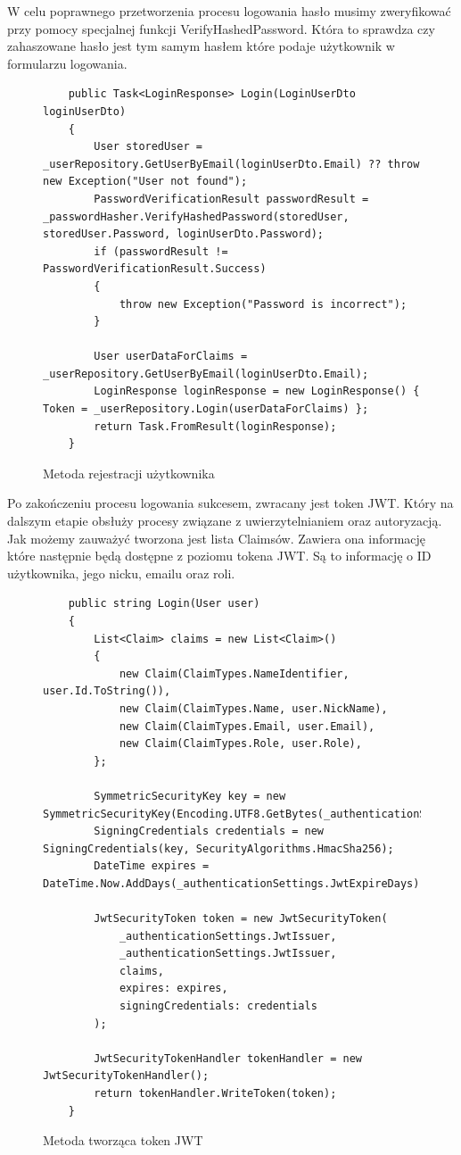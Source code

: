 \documentclass[a4paper,twoside,12pt]{book}
\begin{document}
W celu poprawnego przetworzenia procesu logowania hasło musimy zweryfikować przy pomocy specjalnej funkcji VerifyHashedPassword. Która to sprawdza czy zahaszowane hasło jest tym samym hasłem które podaje użytkownik w formularzu logowania. 

    \begin{figure}[H]
        \begin{lstlisting}
    public Task<LoginResponse> Login(LoginUserDto loginUserDto)
    {
        User storedUser = _userRepository.GetUserByEmail(loginUserDto.Email) ?? throw new Exception("User not found");
        PasswordVerificationResult passwordResult = _passwordHasher.VerifyHashedPassword(storedUser, storedUser.Password, loginUserDto.Password);
        if (passwordResult != PasswordVerificationResult.Success)
        {
            throw new Exception("Password is incorrect");
        }

        User userDataForClaims = _userRepository.GetUserByEmail(loginUserDto.Email);
        LoginResponse loginResponse = new LoginResponse() { Token = _userRepository.Login(userDataForClaims) };
        return Task.FromResult(loginResponse);
    }
        \end{lstlisting}
    \caption{Metoda rejestracji użytkownika}
    \label{fig:pseudokod:listings}
    \end{figure}

Po zakończeniu procesu logowania sukcesem, zwracany jest token JWT. Który na dalszym etapie obsłuży procesy związane z uwierzytelnianiem oraz autoryzacją. Jak możemy zauważyć tworzona jest lista Claimsów. Zawiera ona informację które następnie będą dostępne z poziomu tokena JWT. Są to informację o ID użytkownika, jego nicku, emailu oraz roli.

        \begin{figure}[H]
        \begin{lstlisting}
    public string Login(User user)
    {
        List<Claim> claims = new List<Claim>()
        {
            new Claim(ClaimTypes.NameIdentifier, user.Id.ToString()),
            new Claim(ClaimTypes.Name, user.NickName),
            new Claim(ClaimTypes.Email, user.Email),
            new Claim(ClaimTypes.Role, user.Role),
        };

        SymmetricSecurityKey key = new SymmetricSecurityKey(Encoding.UTF8.GetBytes(_authenticationSettings.JwtKey));
        SigningCredentials credentials = new SigningCredentials(key, SecurityAlgorithms.HmacSha256);
        DateTime expires = DateTime.Now.AddDays(_authenticationSettings.JwtExpireDays);

        JwtSecurityToken token = new JwtSecurityToken(
            _authenticationSettings.JwtIssuer,
            _authenticationSettings.JwtIssuer,
            claims,
            expires: expires,
            signingCredentials: credentials
        );

        JwtSecurityTokenHandler tokenHandler = new JwtSecurityTokenHandler();
        return tokenHandler.WriteToken(token);
    }
        \end{lstlisting}
    \caption{Metoda tworząca token JWT}
    \label{fig:pseudokod:listings}
    \end{figure}
\end{document}
